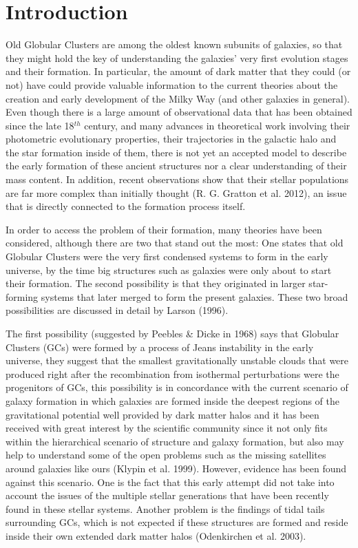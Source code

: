 \chapter{Introduction}

Old Globular Clusters are among the oldest known subunits of galaxies, so that they might hold the key of understanding the galaxies' very first evolution stages and their formation. In particular, the amount of dark matter that they could (or not) have could provide valuable information to the current theories about the creation and early development of the Milky Way (and other galaxies in general). Even though there is a large amount of observational data that has been obtained since the late 18$^{th}$ century, and many advances in theoretical work involving their photometric evolutionary properties, their trajectories in the galactic halo and the star formation inside of them, there is not yet an accepted model to describe the early formation of these ancient structures nor a clear understanding of their mass content. In addition, recent observations show that their stellar populations are far more complex than initially thought (R. G. Gratton et al. 2012), an issue that is directly connected to the formation process itself. 

In order to access the problem of their formation, many theories have been considered, although there are two that stand out the most: One states that old Globular Clusters were the very first condensed systems to form in the early universe, by the time big structures such as galaxies were only about to start their formation. The second possibility is that they originated in larger star-forming systems that later merged to form the present galaxies. These two broad possibilities are discussed in detail by Larson (1996).

The first possibility (suggested by Peebles \& Dicke in 1968) says that Globular Clusters (GCs) were formed by a process of Jeans instability in the early universe, they suggest that the smallest gravitationally unstable clouds that were produced right after the recombination from isothermal perturbations were the progenitors of GCs, this possibility is in concordance with the current scenario of galaxy formation in which galaxies are formed inside the deepest regions of the gravitational potential well provided by dark matter halos and it has been received with great interest by the scientific community since it not only fits within the hierarchical scenario of structure and galaxy formation, but also may help to understand some of the open problems such as the missing satellites around galaxies like ours (Klypin et al. 1999). However, evidence has been found against this scenario. One is the fact that this early attempt did not take into account the issues of the multiple stellar generations that have been recently found in these stellar systems. Another problem is the findings of tidal tails surrounding GCs, which is not expected if these structures are formed and reside inside their own extended dark matter halos (Odenkirchen et al. 2003).

